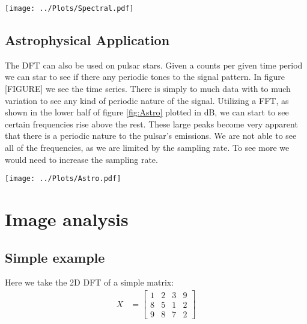 \documentclass[twocolumn]{myarticle}
\begin{document}
\begin{figure*}[htb]
    \centering
    \texttt{[image: ../Plots/Spectral.pdf]}
    \caption{Spectrogram showing the DFT of x(t). The Power in dB is displayed in the colour, the frequency along the y-axis and the radius along the x-axis}
    \label{fig:Spectral}
\end{figure*}

\subsection{Astrophysical Application}
The DFT can also be used on pulsar stars. Given a counts per given time period we can star to see if there any periodic tones to the signal pattern. In figure [FIGURE] we see the time series. There is simply to much data with to much variation to see any kind of periodic nature of the signal. Utilizing a FFT, as shown in the lower half of figure \ref{fig:Astro} plotted in dB, we can start to see certain frequencies rise above the rest. These large peaks become very apparent that there is a periodic nature to the pulsar's emissions. We are not able to see all of the frequencies, as we are limited by the sampling rate. To see more we would need to increase the sampling rate.

\begin{figure*}[htb]
    \centering
    \texttt{[image: ../Plots/Astro.pdf]}
    \caption{The time series and the DFT of the pulsar star signal}
    \label{fig:Astro}
\end{figure*}

\section{Image analysis}
\label{sec:image_analysis}

\subsection{Simple example}
\label{subsec:simple_example}

Here we take the 2D DFT of a simple matrix:
\begin{align}
    X &= \begin{bmatrix} 1 & 2 & 3 & 9 \\ 8 & 5 & 1 & 2 \\ 9 & 8 & 7 & 2 \end{bmatrix}
\end{align}
\end{document}
